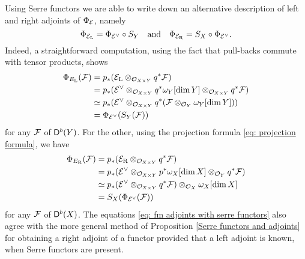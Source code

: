 \begin{remark}
    \label{another description of adjoints of FM}
    Using Serre functors we are able to write down an alternative description of left and right adjoints of $\Phi_{\mathcal E}$, namely
    \begin{equation}
        \label{eq: fm adjoints with serre functors}
        \Phi_{\mathcal E_\mathrm{L}} = \Phi_{\mathcal E^\vee} \circ S_Y \quad \text{and} \quad 
        \Phi_{\mathcal E_\mathrm{R}} = S_X \circ \Phi_{\mathcal E^\vee}.
    \end{equation}
    Indeed, a straightforward computation, using the fact that pull-backs commute with tensor products, shows
    \begin{align*}
        \Phi_{E_\mathrm{L}}(\mathcal F) &= p_*(\mathcal E_\mathrm{L} \otimes_{{\mathcal{O}_{X \times Y}}} q^*\mathcal F) \\
        &= p_*(\mathcal E^\vee \otimes_{{\mathcal{O}_{X \times Y}}} q^*\omega_Y[\dim Y] \otimes_{{\mathcal{O}_{X \times Y}}} q^*\mathcal F) \\
        &\simeq p_*(\mathcal E^\vee \otimes_{{\mathcal{O}_{X \times Y}}} q^*(\mathcal F \otimes_{{\mathcal{O}_{Y}}} \omega_Y[\dim Y])) \\
        &= \Phi_{\mathcal E^\vee}(S_Y(\mathcal F))
    \end{align*}
    for any $\mathcal F$ of $\mathsf{D}^b(Y)$. For the other, using the projection formula \eqref{eq: projection formula}, we have
    \begin{align*}
        \Phi_{E_\mathrm{R}}(\mathcal F) &= p_*(\mathcal E_\mathrm{R} \otimes_{{\mathcal{O}_{X \times Y}}} q^*\mathcal F) \\
        &= p_*(\mathcal E^\vee \otimes_{{\mathcal{O}_{X \times Y}}} p^*\omega_X[\dim X] \otimes_{{\mathcal{O}_{Y}}} q^*\mathcal F) \\
        & \simeq p_*(\mathcal E^\vee \otimes_{{\mathcal{O}_{X \times Y}}} q^*\mathcal F) \otimes_{\mathcal{O}_{X}} \omega_X[\dim X] \\
        &= S_X(\Phi_{\mathcal E^\vee}(\mathcal F))
    \end{align*}
    for any $\mathcal F$ of $\mathsf{D}^b(X)$. The equations \eqref{eq: fm adjoints with serre functors} also agree with the more general method of Proposition \ref{Serre functors and adjoints} for obtaining a right adjoint of a functor provided that a left adjoint is known, when Serre functors are present.
\end{remark}

